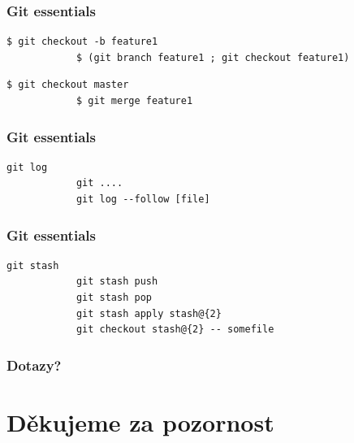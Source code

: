 \documentclass{beamer}
\begin{document}
    \begin{frame}[fragile]
        \frametitle{Git essentials}
        \begin{lstlisting}[gobble=12]
            $ git checkout -b feature1
            $ (git branch feature1 ; git checkout feature1)
        \end{lstlisting}
        \begin{lstlisting}[gobble=12]
            $ git checkout master
            $ git merge feature1
        \end{lstlisting}

    \end{frame}
    \begin{frame}[fragile]
        \frametitle{Git essentials}
        \begin{lstlisting}[gobble=12]
            git log
            git ....
            git log --follow [file]
        \end{lstlisting}
    \end{frame}
    \begin{frame}[fragile]
        \frametitle{Git essentials}
        \begin{lstlisting}[gobble=12]
            git stash
            git stash push
            git stash pop
            git stash apply stash@{2}
            git checkout stash@{2} -- somefile
        \end{lstlisting}
    \end{frame}
    \begin{frame}
        \frametitle{Dotazy?}
    \end{frame}
    \section{Děkujeme za pozornost}
\end{document}
